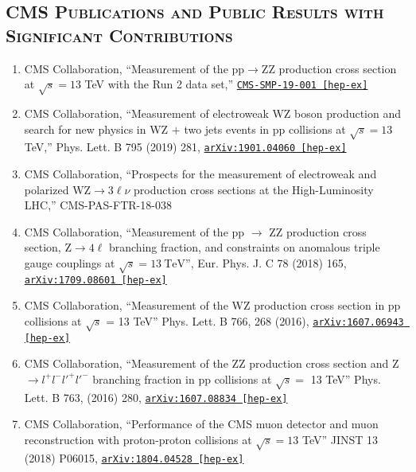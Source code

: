 \documentclass[10pt]{res} %
\begin{document}
\begin{resume}
\section{\textsc{CMS Publications and Public Results with Significant Contributions}}
\begin{enumerate}
  \item CMS Collaboration, ``Measurement of the pp$\to$ZZ production cross section at $\sqrt{s}=13$ TeV with the Run 2 data set,'' \href{http://cms-results.web.cern.ch/cms-results/public-results/preliminary-results/SMP-19-001/index.html} {\texttt{CMS-SMP-19-001 [hep-ex]}}
  \item CMS Collaboration, ``Measurement of electroweak WZ boson production and search for new physics in WZ $+$ two jets events in pp collisions at $\sqrt{s}=13$\,TeV,'' Phys. Lett. B 795 (2019) 281, \href{https://arxiv.org/abs/1901.04060} {\texttt{arXiv:1901.04060 [hep-ex]}}
  \item CMS Collaboration, ``Prospects for the measurement of electroweak and polarized $\mathrm{WZ}\to3\ell\nu$ production cross sections at the High-Luminosity LHC,'' CMS-PAS-FTR-18-038
  \item CMS Collaboration, ``Measurement of the pp $\rightarrow$ ZZ production cross section, $\mathrm{Z} \to 4\ell$ branching fraction, and constraints on anomalous triple gauge couplings at $\sqrt{s} = 13~\mathrm{TeV}$'', Eur. Phys. J. C 78 (2018) 165, \href{https://arxiv.org/abs/1709.08601}{\texttt{arXiv:1709.08601 [hep-ex]}}
  \item CMS Collaboration, ``Measurement of the WZ production cross section in pp collisions at $\sqrt{s}$ = 13 TeV''
Phys. Lett. B 766, 268 (2016), \href{https://arxiv.org/abs/1607.06943}{\texttt{arXiv:1607.06943 [hep-ex]}}
  \item CMS Collaboration, ``Measurement of the ZZ production cross section and Z $\rightarrow l^{+}l^{-}l'^{+}l'^{-}$ branching fraction in pp collisions at $\sqrt{s} =$ 13 TeV''
Phys. Lett. B 763, (2016) 280, \href{https://arxiv.org/abs/1607.08834} {\texttt{arXiv:1607.08834 [hep-ex]}}
  \item CMS Collaboration, ``Performance of the CMS muon detector and muon reconstruction with proton-proton collisions at $\sqrt{s} = 13$ TeV''
JINST 13 (2018) P06015, \href{https://arxiv.org/abs/1804.04528} {\texttt{arXiv:1804.04528 [hep-ex]}}
\end{enumerate}


\end{resume}
\end{document}

